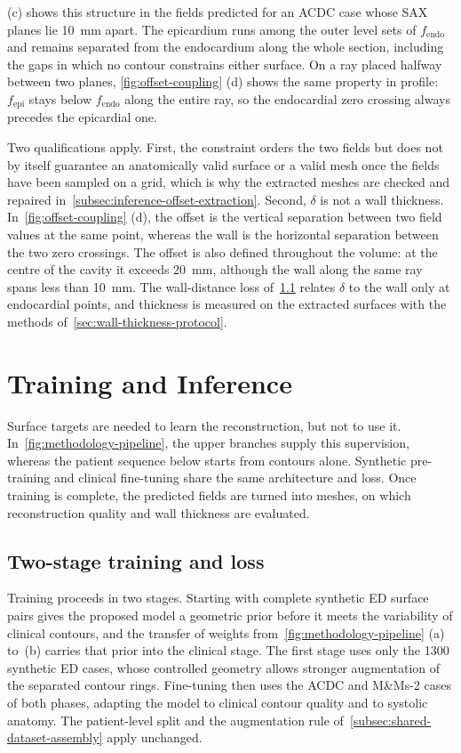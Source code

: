  (c) shows this structure in the fields predicted for
an ACDC case whose SAX planes lie 10~mm apart. The epicardium runs among the
outer level sets of $f_{\mathrm{endo}}$ and remains separated from the
endocardium along the whole section, including the gaps in which no contour
constrains either surface. On a ray placed halfway between two planes,
\cref{fig:offset-coupling} (d) shows the same property in profile:
$f_{\mathrm{epi}}$ stays below $f_{\mathrm{endo}}$ along the entire ray, so
the endocardial zero crossing always precedes the epicardial one.

Two qualifications apply. First, the constraint orders the two fields but does
not by itself guarantee an anatomically valid surface or a valid mesh once the
fields have been sampled on a grid, which is why the extracted meshes are
checked and repaired in~\cref{subsec:inference-offset-extraction}. Second,
$\delta$ is not a wall thickness. In~\cref{fig:offset-coupling} (d), the offset
is the vertical separation between two field values at the same point,
whereas the wall is the horizontal separation between the two zero crossings.
The offset is also defined throughout the volume: at the centre of the cavity
it exceeds 20~mm, although the wall along the same ray spans less than 10~mm.
The wall-distance loss of~\cref{subsec:training-data-mix} relates $\delta$ to
the wall only at endocardial points, and thickness is measured on the
extracted surfaces with the methods of~\cref{sec:wall-thickness-protocol}.

\section{Training and Inference}
\label{sec:training-inference}
\noindent
Surface targets are needed to learn the reconstruction, but not to use it.
In~\cref{fig:methodology-pipeline}, the upper branches supply this
supervision, whereas the patient sequence below starts from contours alone.
Synthetic pre-training and clinical fine-tuning share the same architecture
and loss. Once training is complete, the predicted fields are turned into
meshes, on which reconstruction quality and wall thickness are evaluated.

\subsection{Two-stage training and loss}
\label{subsec:training-data-mix}
\noindent
Training proceeds in two stages. Starting with complete synthetic ED surface
pairs gives the proposed model a geometric prior before it
meets the variability of clinical contours, and the transfer of weights
from~\cref{fig:methodology-pipeline} (a) to~(b) carries that prior into the
clinical stage. The first stage uses only the 1300 synthetic ED cases, whose
controlled geometry allows stronger augmentation of the separated contour
rings. Fine-tuning then uses the ACDC and M\&Ms-2 cases of both phases,
adapting the model to clinical contour quality and to
systolic anatomy. The
patient-level split and the augmentation rule of~\cref{subsec:shared-dataset-assembly} apply unchanged.

